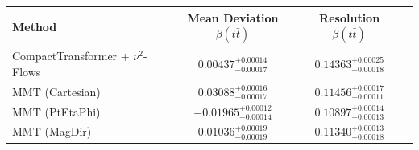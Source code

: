     \begin{tabular}{lccc}
        \toprule
        Method & Mean Deviation $\beta(t\bar{t})$ & Resolution $\beta(t\bar{t})$ \\
        \midrule
        CompactTransformer + $\nu^2$-Flows & $0.00437^{+0.00014}_{-0.00017}$ & $0.14363^{+0.00025}_{-0.00018}$ \\
        MMT (Cartesian) & $0.03088^{+0.00016}_{-0.00017}$ & $0.11456^{+0.00017}_{-0.00011}$ \\
        MMT (PtEtaPhi) & $-0.01965^{+0.00012}_{-0.00014}$ & $0.10897^{+0.00014}_{-0.00013}$ \\
        MMT (MagDir) & $0.01036^{+0.00019}_{-0.00019}$ & $0.11340^{+0.00013}_{-0.00018}$ \\
        \bottomrule
    \end{tabular}